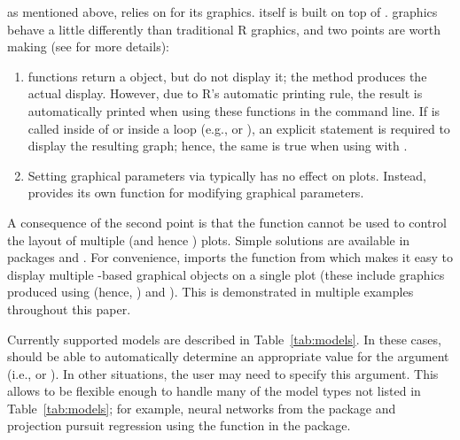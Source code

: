  as mentioned above,  relies on  for its graphics.  itself is built on top of  \citep{grid-pkg}.  graphics behave a little differently than traditional R graphics, and two points are worth making (see  for more details):
\begin{enumerate}
  \item {} functions return a  object, but do not display it; the  method produces the actual display. However, due to R's automatic printing rule, the result is automatically printed when using these functions in the command line. If  is called inside of  or inside a loop (e.g.,  or ), an explicit  statement is required to display the resulting graph; hence, the same is true when using  with .
  \item Setting graphical parameters via  typically has no effect on  plots. Instead,  provides its own  function for modifying graphical parameters.
\end{enumerate}
A consequence of the second point is that the  function cannot be used to control the layout of multiple  (and hence ) plots. Simple solutions are available in packages  \citep{latticeExtra-pkg} and  \citep{gridExtra-pkg}. For convenience,  imports the  function from  which makes it easy to display multiple -based graphical objects on a single plot (these include graphics produced using  (hence, ) and ). This is demonstrated in multiple examples throughout this paper.

Currently supported models are described in Table~\ref{tab:models}. In these cases,  should be able to automatically determine an appropriate value for the argument  (i.e.,  or ). In other situations, the user may need to specify this argument. This allows  to be flexible enough to handle many of the model types not listed in Table~\ref{tab:models}; for example, neural networks from the  package \citep{venables-modern-2002} and projection pursuit regression \citep{friedman-ppr-1981} using the  function in the  package.

